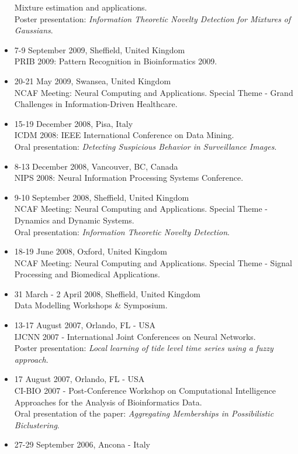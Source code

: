 \documentclass[a4paper,10pt]{article}
\begin{document}
\begin{itemize}
  Mixture estimation and applications.
  \\Poster presentation: \emph{Information Theoretic Novelty Detection for Mixtures of Gaussians}.
\item 7-9 September 2009, Sheffield, United Kingdom \\
  PRIB 2009: Pattern Recognition in Bioinformatics 2009.
\item 20-21 May 2009, Swansea, United Kingdom \\
  NCAF Meeting: Neural Computing and Applications. Special Theme - Grand Challenges in Information-Driven Healthcare.
\item 15-19 December 2008, Pisa, Italy \\
  ICDM 2008: IEEE International Conference on Data Mining.
  \\Oral presentation: \emph{Detecting Suspicious Behavior in Surveillance Images}.
\item 8-13 December 2008, Vancouver, BC, Canada \\
  NIPS 2008: Neural Information Processing Systems Conference.
\item 9-10 September 2008, Sheffield, United Kingdom \\
  NCAF Meeting: Neural Computing and Applications. Special Theme - Dynamics and Dynamic Systems.
  \\Oral presentation: \emph{Information Theoretic Novelty Detection}.
\item 18-19 June 2008, Oxford, United Kingdom \\
  NCAF Meeting: Neural Computing and Applications. Special Theme - Signal Processing and Biomedical Applications.
\item 31 March - 2 April 2008, Sheffield, United Kingdom \\
  Data Modelling Workshops \& Symposium.
\item 13-17 August 2007, Orlando, FL - USA \\
  IJCNN 2007 - International Joint Conferences on Neural Networks.
  \\Poster presentation: \emph{Local learning of tide level time series using a fuzzy approach}.
\item 17 August 2007, Orlando, FL - USA \\
  CI-BIO 2007 - Post-Conference Workshop on Computational Intelligence Approaches for the Analysis of Bioinformatics Data.
  \\Oral presentation of the paper: \emph{Aggregating Memberships in Possibilistic Biclustering}.
\item 27-29 September 2006, Ancona - Italy \\

\end{itemize}
\end{document}
